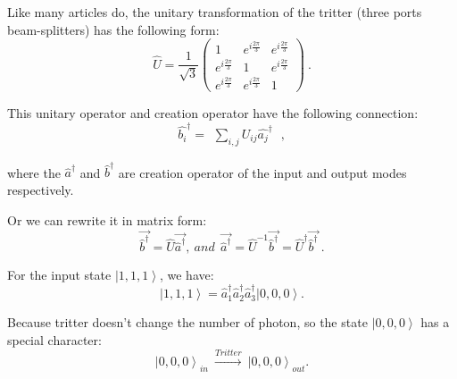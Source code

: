 \documentclass[%
 reprint,
 amsmath,amssymb,
 aps,
onecolumn
]{revtex4-2}
\begin{document}
Like many articles do, the unitary transformation of the tritter
(three ports beam-splitters) has the following form:
\begin{equation}
  \hat{U} = \frac{1}{\sqrt{3}}
  \begin{pmatrix}
  1 & e^{i\frac{2\pi}{3}} & e^{i\frac{2\pi}{3}} \\
  e^{i\frac{2\pi}{3}} & 1 & e^{i\frac{2\pi}{3}} \\
  e^{i\frac{2\pi}{3}} & e^{i\frac{2\pi}{3}} & 1 
  \end{pmatrix}
  ~.
\end{equation}

This unitary operator and creation operator have the following 
connection:
\begin {equation}
\hat{b_i}^\dagger = 
\begin{matrix} \sum_{i,j} U_{ij}\hat{a_j}^\dagger \end{matrix}~,
\end{equation}

where the $\hat{a}^\dagger$ and $\hat{b}^\dagger$ are creation 
operator of the input and output modes respectively.

Or we can rewrite it in matrix form:
\begin {equation}
\overrightarrow{\hat{b}^\dagger} = 
\hat{U}\overrightarrow{\hat{a}^\dagger}
,~and~~
\overrightarrow{\hat{a}^\dagger} = 
\hat{U}^{-1}\overrightarrow{\hat{b}^\dagger}
=\hat{U}^\dagger\overrightarrow{\hat{b}^\dagger}
~.
\end{equation}

For the input state $\left|1,1,1\right\rangle$, we have:
\begin{equation}
\left|1,1,1\right\rangle = \hat{a}_1^\dagger\hat{a}_2^\dagger
\hat{a}_3^\dagger \left|0,0,0\right\rangle.
\end{equation}

Because tritter doesn't change the number of photon, so the state
$\left|0,0,0\right\rangle$ has a special character:
\begin{equation}
  \left|0,0,0\right\rangle_{in} ~\xrightarrow{Tritter}~
  \left|0,0,0\right\rangle_{out}.
\end{equation}
\end{document}
